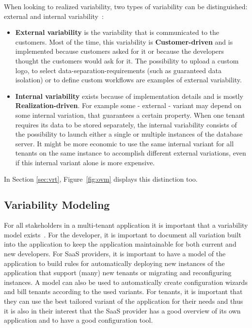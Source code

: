 When looking to realized variability, two types of variability can be distinguished: external and internal variability~\cite{mietzner2009variability}:
\begin{itemize}
\item \textbf{External variability} is the variability that is communicated to the customers. Most of the time, this variability is \textbf{Customer-driven} and is implemented because customers asked for it or because the developers thought the customers would ask for it. The possibility to upload a custom logo, to select data-separation-requirements (such as guaranteed data isolation) or to define custom workflows are examples of external variability.
\item \textbf{Internal variability} exists because of implementation details and is mostly \textbf{Realization-driven}. For example some - external - variant may depend on some internal variation, that guarantees a certain property. When one tenant requires its data to be stored separately, the internal variability consists of the possibility to launch either a single or multiple instances of the database server. It might be more economic to use the same internal variant for all tenants on the same instance to accomplish different external variations, even if this internal variant alone is more expensive.
\end{itemize}
In Section \ref{sec:vrt}, Figure~\ref{fig:ovm} displays this distinction too.  

\subsection{Variability Modeling}
For all stakeholders in a multi-tenant application it is important that a variability model exists~\cite{schroeter2012towards}. For the developer, it is important to document all variation built into the application to keep the application maintainable for both current and new developers. 
For SaaS providers, it is important to have a model of the application to build rules for automatically deploying new instances of the application that support (many) new tenants or migrating and reconfiguring instances. 
A model can also be used to automatically create configuration wizards and bill tenants according to the used variants.  %
For tenants, it is important that they can use the best tailored variant of the application for their needs and thus it is also in their interest that the SaaS provider has a good overview of its own application and to have a good configuration tool.

